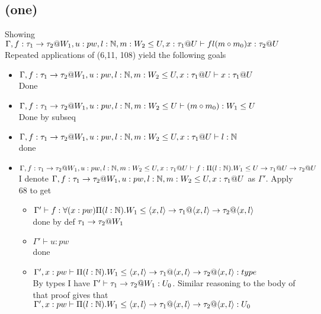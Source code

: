 \message{ !name(paper.tex)}\documentclass{article}
\begin{document}
\subsection*{(one)}
Showing $\Gamma,f:\tau_1\rightarrow\tau_2@W_1,u:pw,l:\mathbb{N},m:W_2\leq U,x:\tau_1@U\vdash fl(m\circ m_0)x:\tau_2@U$ \\
Repeated applications of (6,11, 108) yield the following goals
\begin{itemize}
    \item $\Gamma,f:\tau_1\rightarrow\tau_2@W_1,u:pw,l:\mathbb{N},m:W_2\leq U,x:\tau_1@U\vdash x:\tau_1@U$\\
    Done
    \item  $\Gamma,f:\tau_1\rightarrow\tau_2@W_1,u:pw,l:\mathbb{N},m:W_2\leq U \vdash (m \circ m_0):W_1\leq U$\\
    Done by subseq
    \item $\Gamma,f:\tau_1\rightarrow\tau_2@W_1,u:pw,l:\mathbb{N},m:W_2\leq U,x:\tau_1@U\vdash l : \mathbb{N}$\\
    done
    \item $\Gamma,f:\tau_1\rightarrow\tau_2@W_1,u:pw,l:\mathbb{N},m:W_2\leq U,x:\tau_1@U\vdash f: \Pi(l:\mathbb{N}).W_1 \leq U \rightarrow \tau_1@U \rightarrow \tau_2@U$\\
    I denote $\Gamma,f:\tau_1\rightarrow\tau_2@W_1,u:pw,l:\mathbb{N},m:W_2\leq U,x:\tau_1@U$ as $\Gamma'$.
    Apply 68 to get
    \begin{itemize}
    \item $\Gamma' \vdash f: \forall(x:pw)\Pi(l:\mathbb{N}).W_1 \leq  \langle x, l \rangle \rightarrow \tau_1@ \langle x, l \rangle \rightarrow \tau_2@ \langle x, l \rangle$\\
    done by def $\tau_1\rightarrow\tau_2@W_1$
        \item $\Gamma' \vdash u : pw$\\
        done
        \item $\Gamma', x: pw \vdash \Pi(l:\mathbb{N}).W_1 \leq \langle x, l \rangle \rightarrow \tau_1@ \langle x, l \rangle \rightarrow \tau_2@ \langle x, l \rangle : type$\\
        By types I have $\Gamma' \vdash \tau_1 \rightarrow \tau_2@W_1 : U_0$. Similar reasoning to the body of that proof gives that 
        $\Gamma', x: pw \vdash \Pi(l:\mathbb{N}).W_1 \leq \langle x, l \rangle \rightarrow \tau_1@ \langle x, l \rangle \rightarrow \tau_2@ \langle x, l \rangle : U_0$
    \end{itemize}
\end{itemize}
\end{document}
